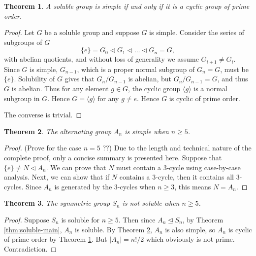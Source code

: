 \documentclass[12pt]{article}
\newtheorem{theorem}{Theorem}
\begin{document}
\begin{theorem} \label{thm:soluble-and-simple}
    A soluble group is simple if and only if it is a cyclic group of prime order.
\end{theorem}

\begin{proof}
    Let $G$ be a soluble group and suppose $G$ is simple. Consider the series of subgroups of $G$
$$
\{ e \}=G_0 \triangleleft G_1 \triangleleft \ldots \triangleleft G_n=G,
$$
with abelian quotients, and without loss of generality we assume $G_{i+1} \neq G_i$. Since $G$ is simple, $G_{n-1}$, which is a proper normal subgroup of $G_n = G$, must be $\{ e \}$. Solubility of $G$ gives that $G_n / G_{n -1 }$ is abelian, but $G_n / G_{n - 1} = G$, and thus $G$ is abelian. Thus for any element $g \in G$, the cyclic group $\langle g\rangle$ is a normal subgroup in $G$. Hence  $G = \langle g\rangle$ for any $g \neq e$. Hence $G$ is cyclic of prime order.

The converse is trivial.
\end{proof}


\begin{theorem} \label{thm:simple-alternating}
    The alternating group $A_n$ is simple when $n \ge 5$. 
\end{theorem}

\begin{proof}
    (Prove for the case $n=5$ ??) Due to the length and technical nature of the complete proof, only a concise summary is presented here. 
    Suppose that $\{ e \} \neq N \triangleleft A_n$. We can prove that $N$ must contain a $3$-cycle using case-by-case analysis. Next, we can show that if $N$ contains a $3$-cycle, then it contains all $3$-cycles. Since $A_n$ is generated by the $3$-cycles when $n \ge 3$, this means $N = A_n$.
\end{proof}

\begin{theorem} \label{thm:symmetric-not-soluble}
    The symmetric group $S_n$ is not soluble when $n \ge 5$. 
\end{theorem}

\begin{proof}
    Suppose $S_n$ is soluble for $n \ge 5$. Then since $A_n \trianglelefteq S_n$, by Theorem \ref{thm:soluble-main}, $A_n$ is soluble. By Theorem \ref{thm:simple-alternating}, $A_n$ is also simple, so $A_n$ is cyclic of prime order by Theorem \ref{thm:soluble-and-simple}. But $|A_n| = n! / 2$ which obviously is not prime. Contradiction.
\end{proof}
\end{document}
